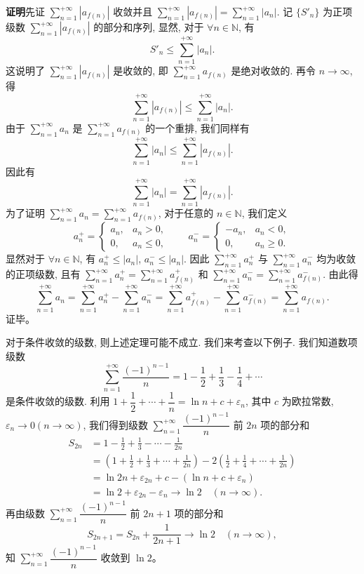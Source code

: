 \documentclass[UTF8, 12pt, fontset=fandol, oneside]{ctexart}
\begin{document}
\noindent\textbf{证明}\quad 先证 $\sum\limits_{n=1}^{+\infty}|a_{f(n)}|$ 收敛并且 $\sum\limits_{n=1}^{+\infty}|a_{f(n)}|=\sum\limits_{n=1}^{+\infty}|a_n|$. 记 $\{S'_n\}$ 为正项级数 $\sum\limits_{n=1}^{+\infty}|a_{f(n)}|$ 的部分和序列, 显然, 对于 $\forall n\in\mathbb{N}$, 有
\[
  S'_n\leq\sum_{n=1}^{+\infty}|a_n|.
\]
这说明了 $\sum\limits_{n=1}^{+\infty}|a_{f(n)}|$ 是收敛的, 即 $\sum\limits_{n=1}^{+\infty}a_{f(n)}$ 是绝对收敛的. 再令 $n\to\infty$, 得
\[
  \sum_{n=1}^{+\infty}|a_{f(n)}|\leq\sum_{n=1}^{+\infty}|a_n|.
\]
由于 $\sum\limits_{n=1}^{+\infty}a_n$ 是 $\sum\limits_{n=1}^{+\infty}a_{f(n)}$ 的一个重排, 我们同样有
\[
  \sum_{n=1}^{+\infty}|a_n|\leq\sum_{n=1}^{+\infty}|a_{f(n)}|.
\]
因此有
\[
  \sum_{n=1}^{+\infty}|a_n|=\sum_{n=1}^{+\infty}|a_{f(n)}|.
\]
为了证明 $\sum\limits_{n=1}^{+\infty}a_n=\sum\limits_{n=1}^{+\infty}a_{f(n)}$, 对于任意的 $n\in\mathbb{N}$, 我们定义
\[
  a_n^+=
  \begin{cases}
    a_n, & a_n>0,\\
    0, & a_n\leq0,
  \end{cases}
  \qquad
  a_n^-=
  \begin{cases}
    -a_n, & a_n<0,\\
    0, & a_n\geq0.
  \end{cases}
  \tag{9.4.1}
\]
显然对于 $\forall n\in\mathbb{N}$, 有 $a_n^+\leq|a_n|$, $a_n^-\leq|a_n|$. 因此 $\sum\limits_{n=1}^{+\infty}a_n^+$ 与 $\sum\limits_{n=1}^{+\infty}a_n^-$ 均为收敛的正项级数, 且有 $\sum\limits_{n=1}^{+\infty}a_n^+=\sum\limits_{n=1}^{+\infty}a_{f(n)}^+$ 和 $\sum\limits_{n=1}^{+\infty}a_n^-=\sum\limits_{n=1}^{+\infty}a_{f(n)}^-$. 由此得
\[
  \sum_{n=1}^{+\infty}a_n
  =\sum_{n=1}^{+\infty}a_n^+-\sum_{n=1}^{+\infty}a_n^-
  =\sum_{n=1}^{+\infty}a_{f(n)}^+-\sum_{n=1}^{+\infty}a_{f(n)}^-
  =\sum_{n=1}^{+\infty}a_{f(n)}.
\]
证毕。

对于条件收敛的级数, 则上述定理可能不成立. 我们来考查以下例子. 我们知道数项级数
\[
  \sum_{n=1}^{+\infty}\frac{(-1)^{n-1}}{n}=1-\frac12+\frac13-\frac14+\cdots
\]
是条件收敛的级数. 利用 $1+\dfrac12+\cdots+\dfrac1n=\ln n+c+\varepsilon_n$, 其中 $c$ 为欧拉常数, $\varepsilon_n\to0(n\to\infty)$, 我们得到级数 $\sum\limits_{n=1}^{+\infty}\dfrac{(-1)^{n-1}}{n}$ 前 $2n$ 项的部分和
\[
\begin{aligned}
  S_{2n}
  &=1-\frac12+\frac13-\cdots-\frac1{2n}\\
  &=\left(1+\frac12+\frac13+\cdots+\frac1{2n}\right)-2\left(\frac12+\frac14+\cdots+\frac1{2n}\right)\\
  &=\ln2n+\varepsilon_{2n}+c-(\ln n+c+\varepsilon_n)\\
  &=\ln2+\varepsilon_{2n}-\varepsilon_n\to\ln2\quad(n\to\infty).
\end{aligned}
\]
再由级数 $\sum\limits_{n=1}^{+\infty}\dfrac{(-1)^{n-1}}{n}$ 前 $2n+1$ 项的部分和
\[
  S_{2n+1}=S_{2n}+\frac1{2n+1}\to\ln2\quad(n\to\infty),
\]
知 $\sum\limits_{n=1}^{+\infty}\dfrac{(-1)^{n-1}}{n}$ 收敛到 $\ln2$。
\end{document}
